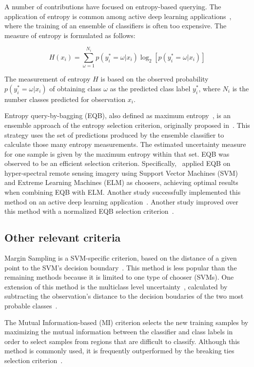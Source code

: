 \documentclass[parskip=full]{scrartcl}
\begin{document}
A number of contributions have focused on entropy-based querying. The application of entropy is
common among active deep learning applications~\cite{Aghdam2019}, where the training of an ensemble
of classifiers is often too expensive. The measure of entropy is formulated as follows:

\begin{equation}
    H(x_i) = \sum_{\omega=1}^{N_i}{p(y_{i}^{*}=\omega|x_i)}\log_2[p(y_{i}^{*}=\omega|x_i)]
\end{equation}

The measurement of entropy $H$ is based on the observed probability $p(y_{i}^{*}=\omega|x_i)$ of
obtaining class $\omega$ as the predicted class label $y_{i}^{*}$, where $N_i$ is the number classes
predicted for observation $x_i$.

Entropy query-by-bagging (EQB), also defined as maximum entropy~\cite{Liu2020}, is an ensemble
approach of the entropy selection criterion, originally proposed in~\cite{Tuia2009}. This strategy
uses the set of predictions produced by the ensemble classifier to calculate those many entropy
measurements. The estimated uncertainty measure for one sample is given by the maximum entropy
within that set. EQB was observed to be an efficient selection criterion.
Specifically,~\cite{Shrivastava2021} applied EQB on hyper-spectral remote sensing imagery using
Support Vector Machines (SVM) and Extreme Learning Machines (ELM) as choosers, achieving optimal
results when combining EQB with ELM\@. Another study successfully implemented this method on an
active deep learning application~\cite{Liu2020}. Another study improved over this method with a
normalized EQB selection criterion~\cite{Copa2010}.

\subsection{Other relevant criteria}

Margin Sampling is a SVM-specific criterion, based on the distance of a given point to the SVM's
decision boundary~\cite{Shrivastava2021}. This method is less popular than the remaining methods
because it is limited to one type of chooser (SVMs). One extension of this method is the multiclass
level uncertainty~\cite{Shrivastava2021}, calculated by subtracting the observation's distance to
the decision boudaries of the two most probable classes~\cite{Demir2011}.

The Mutual Information-based (MI) criterion selects the new training samples by maximizing the
mutual information between the classifier and class labels in order to select samples from regions
that are difficult to classify. Although this method is commonly used, it is frequently outperformed
by the breaking ties selection criterion~\cite{Li2011,Liu2018}.
\end{document}
